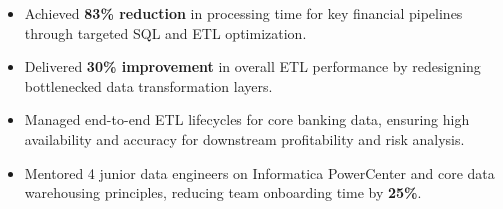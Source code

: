 

\begin{itemize}
  \item Achieved \textbf{83\% reduction} in processing time for key financial pipelines
        through targeted SQL and ETL optimization.

  \item Delivered \textbf{30\% improvement} in overall ETL performance by redesigning
        bottlenecked data transformation layers.

  \item Managed end-to-end ETL lifecycles for core banking data, ensuring high availability
        and accuracy for downstream profitability and risk analysis.

  \item Mentored 4 junior data engineers on Informatica PowerCenter and core data warehousing
        principles, reducing team onboarding time by \textbf{25\%}.
\end{itemize}

